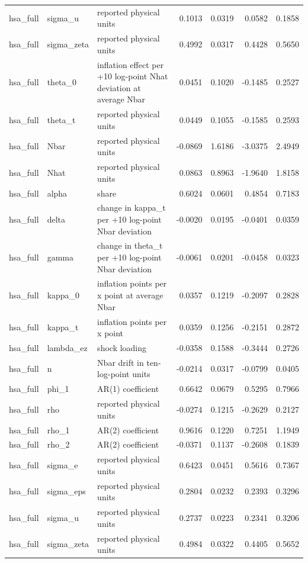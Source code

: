 \begin{tabular}{lllrrrr}
hsa\_full & sigma\_u & reported physical units & 0.1013 & 0.0319 & 0.0582 & 0.1858 \\
hsa\_full & sigma\_zeta & reported physical units & 0.4992 & 0.0317 & 0.4428 & 0.5650 \\
hsa\_full & theta\_0 & inflation effect per +10 log-point Nhat deviation at average Nbar & 0.0451 & 0.1020 & -0.1485 & 0.2527 \\
hsa\_full & theta\_t & reported physical units & 0.0449 & 0.1055 & -0.1585 & 0.2593 \\
hsa\_full & Nbar & reported physical units & -0.0869 & 1.6186 & -3.0375 & 2.4949 \\
hsa\_full & Nhat & reported physical units & 0.0863 & 0.8963 & -1.9640 & 1.8158 \\
hsa\_full & alpha & share & 0.6024 & 0.0601 & 0.4854 & 0.7183 \\
hsa\_full & delta & change in kappa\_t per +10 log-point Nbar deviation & -0.0020 & 0.0195 & -0.0401 & 0.0359 \\
hsa\_full & gamma & change in theta\_t per +10 log-point Nbar deviation & -0.0061 & 0.0201 & -0.0458 & 0.0323 \\
hsa\_full & kappa\_0 & inflation points per x point at average Nbar & 0.0357 & 0.1219 & -0.2097 & 0.2828 \\
hsa\_full & kappa\_t & inflation points per x point & 0.0359 & 0.1256 & -0.2151 & 0.2872 \\
hsa\_full & lambda\_ez & shock loading & -0.0358 & 0.1588 & -0.3444 & 0.2726 \\
hsa\_full & n & Nbar drift in ten-log-point units & -0.0214 & 0.0317 & -0.0799 & 0.0405 \\
hsa\_full & phi\_1 & AR(1) coefficient & 0.6642 & 0.0679 & 0.5295 & 0.7966 \\
hsa\_full & rho & reported physical units & -0.0274 & 0.1215 & -0.2629 & 0.2127 \\
hsa\_full & rho\_1 & AR(2) coefficient & 0.9616 & 0.1220 & 0.7251 & 1.1949 \\
hsa\_full & rho\_2 & AR(2) coefficient & -0.0371 & 0.1137 & -0.2608 & 0.1839 \\
hsa\_full & sigma\_e & reported physical units & 0.6423 & 0.0451 & 0.5616 & 0.7367 \\
hsa\_full & sigma\_eps & reported physical units & 0.2804 & 0.0232 & 0.2393 & 0.3296 \\
hsa\_full & sigma\_u & reported physical units & 0.2737 & 0.0223 & 0.2341 & 0.3206 \\
hsa\_full & sigma\_zeta & reported physical units & 0.4984 & 0.0322 & 0.4405 & 0.5652 \\

\end{tabular}
